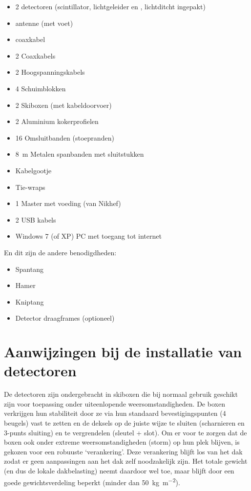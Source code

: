 \begin{itemize}
    \item 2 \hisparc detectoren (scintillator, lichtgeleider en \pmt,
    lichtditcht ingepakt)
    \item \gps antenne (met voet)
    \item \gps coaxkabel
    \item 2 Coaxkabels
    \item 2 Hoogspanningskabels
    \item 4 Schuimblokken
    \item 2 Skiboxen (met kabeldoorvoer)
    \item 2 Aluminium kokerprofielen
    \item 16 Omsluitbanden (stoepranden)
    \item \SI{8}{\meter} Metalen spanbanden met sluitstukken
    \item Kabelgootje
    \item Tie-wraps
    \item 1 \hisparc Master met voeding (van Nikhef)
    \item 2 USB kabels
    \item Windows 7 (of XP) PC met toegang tot internet
\end{itemize}

En dit zijn de andere benodigdheden:

\begin{itemize}
    \item Spantang
    \item Hamer
    \item Kniptang
    \item Detector draagframes (optioneel)
\end{itemize}


\section{Aanwijzingen bij de installatie van \hisparc detectoren}

De \hisparc detectoren zijn ondergebracht in skiboxen die bij normaal
gebruik geschikt zijn voor toepassing onder uiteenlopende
weersomstandigheden. De boxen verkrijgen hun stabiliteit door ze via hun
standaard bevestigingspunten (4 beugels) vast te zetten en de deksels op
de juiste wijze te sluiten (scharnieren en 3-punts sluiting) en te
vergrendelen (sleutel + slot). Om er voor te zorgen dat de boxen ook
onder extreme weersomstandigheden (storm) op hun plek blijven, is
gekozen voor een robuuste ‘verankering’. Deze verankering blijft los van
het dak zodat er geen aanpassingen aan het dak zelf noodzakelijk zijn.
Het totale gewicht (en dus de lokale dakbelasting) neemt daardoor wel
toe, maar blijft door een goede gewichtsverdeling beperkt (minder dan
\SI{50}{\kilo\gram\per\square\meter}).

